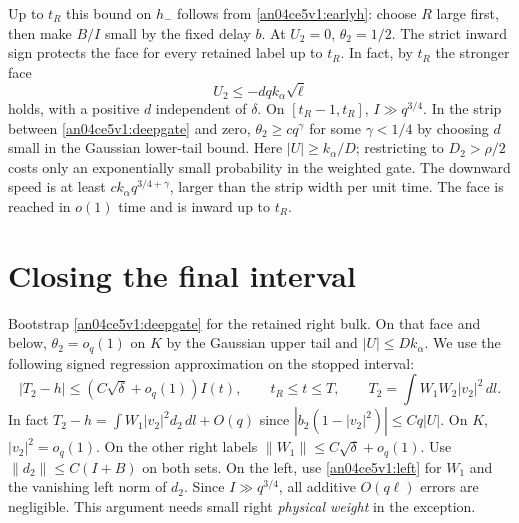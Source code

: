 \documentclass[11pt]{article}
\newcommand{\dd}{\,dl}
\newcommand{\norm}[1]{\lVert #1\rVert}
\begin{document}
Up to $t_R$ this bound on $h_-$ follows from \eqref{an04ce5v1:earlyh}:
choose $R$ large first, then make $B/I$ small by the fixed delay $b$.
At $U_2=0$, $\theta_2=1/2$. The strict inward sign protects the face
for every retained label up to $t_R$. In fact, by $t_R$ the stronger
face
\begin{equation}
 U_2\le -d q k_\alpha\sqrt\ell
 \label{an04ce5v1:deepgate}
\end{equation}
holds, with a positive $d$ independent of $\delta$.
On $[t_R-1,t_R]$, $I\gg q^{3/4}$. In the strip between
\eqref{an04ce5v1:deepgate} and zero, $\theta_2\ge c q^\gamma$ for some
$\gamma<1/4$ by choosing $d$ small in the Gaussian lower-tail bound.
Here $|U|\ge k_\alpha/D$; restricting to $D_2>\rho/2$ costs only an
exponentially small probability in the weighted gate. The downward
speed is at least $c k_\alpha q^{3/4+\gamma}$, larger than the strip
width per unit time. The face is reached in $o(1)$ time and is inward
up to $t_R$.

\section{Closing the final interval}\label{an04ce5v1:centered}
Bootstrap \eqref{an04ce5v1:deepgate} for the retained right bulk. On that
face and below, $\theta_2=o_q(1)$ on $K$ by the Gaussian upper tail
and $|U|\le Dk_\alpha$. We use the following signed
regression approximation on the stopped interval:
\begin{equation}
 |T_2-h|\le (C\sqrt\delta+o_q(1))I(t),\qquad t_R\le t\le T,
 \qquad T_2=\int W_1 W_2 |v_2|^2\dd .
 \label{an04ce5v1:t2}
\end{equation}
In fact $T_2-h=\int W_1|v_2|^2 d_2\dd+O(q)$ since
$|b_2(1-|v_2|^2)|\le Cq|U|$. On $K$, $|v_2|^2=o_q(1)$.
On the other right labels $\norm{W_1}\le C\sqrt\delta+o_q(1)$.
Use $\norm{d_2}\le C(I+B)$ on both sets. On the left, use
\eqref{an04ce5v1:left} for $W_1$ and the vanishing left norm of $d_2$.
Since $I\gg q^{3/4}$, all additive $O(q\ell)$ errors are negligible.
This argument needs small right \emph{physical weight} in the exception.
\end{document}
